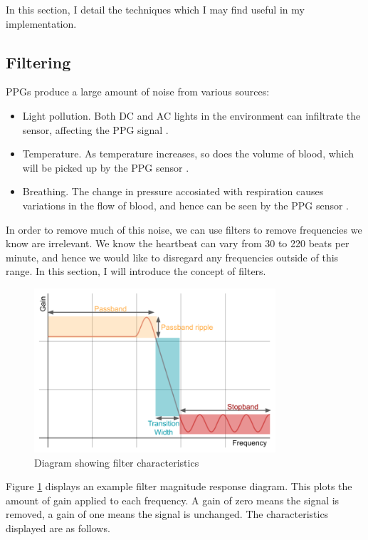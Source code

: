 \documentclass[12pt,a4paper,twoside,openany]{report}
\begin{document}
In this section, I detail the techniques which I may find useful in my
implementation.

\subsection{Filtering} \label{sec:intro-filters}

PPGs produce a large amount of noise from various sources:
\begin{itemize}
	\item Light pollution. Both DC and AC lights in the environment can
		infiltrate the sensor, affecting the PPG signal \cite{kim15}.
	\item Temperature. As temperature increases, so does the volume of
		blood, which will be picked up by the PPG sensor 
		\cite{shin16}.
	\item Breathing. The change in pressure accosiated with respiration
		causes variations in the flow of blood, and hence can be seen
		by the PPG sensor \cite{allen02}.
\end{itemize}

In order to remove much of this noise, we can use filters to remove
frequencies we know are irrelevant. We know the heartbeat can vary from 
30 to 220 beats per minute, and hence we would like to disregard any
frequencies 
outside of this range. In this section, I will introduce the concept of 
filters.

\begin{figure}[h!]
	\centerline{\includegraphics[width=0.8\textwidth]{figs/filter.png}}
\caption{Diagram showing filter characteristics}
\label{fig:filterdiag}
\end{figure}

Figure \ref{fig:filterdiag} displays an example filter magnitude response
diagram. This plots the amount of gain applied to each frequency. A gain of
zero means the signal is removed, a gain of one means the signal is unchanged.
The characteristics displayed are as follows.
\end{document}
